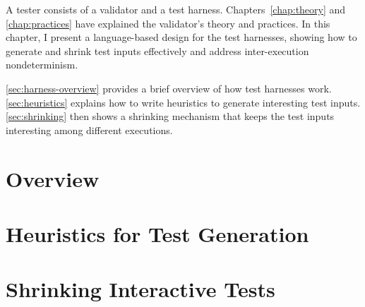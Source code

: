 A tester consists of a validator and a test harness.  Chapters~\ref{chap:theory}
and \ref{chap:practices} have explained the validator's theory and practices.
In this chapter, I present a language-based design for the test harnesses,
showing how to generate and shrink test inputs effectively and address
inter-execution nondeterminism.

\autoref{sec:harness-overview} provides a brief overview of how test harnesses
work.  \autoref{sec:heuristics} explains how to write heuristics to generate
interesting test inputs.  \autoref{sec:shrinking} then shows a shrinking
mechanism that keeps the test inputs interesting among different executions.

\section{Overview}
\label{sec:harness-overview}


\section{Heuristics for Test Generation}
\label{sec:heuristics}


\section{Shrinking Interactive Tests}
\label{sec:shrinking}



